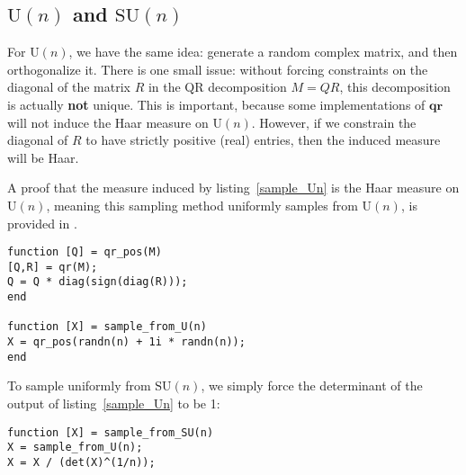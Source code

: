 \documentclass[letterpaper,11pt]{article}
\newcommand{\MG}[2]{\text{#1}(#2)}
\newcommand{\Un}{\MG{U}{n}}
\newcommand{\SUn}{\MG{SU}{n}}
\newcommand{\qr}{\mathbf{qr}}
\begin{document}
\subsection{$\Un$ and $\SUn$}

For $\Un$, we have the same idea: generate a random complex matrix, and then
  orthogonalize it.
There is one small issue: without forcing constraints on the diagonal of the
  matrix $R$ in the QR decomposition $M=QR$, this decomposition is actually
  {\bf not} unique.
This is important, because some implementations of $\qr$ will not induce
  the Haar measure on $\Un$.
However, if we constrain the diagonal of $R$ to have strictly positive (real)
  entries, then the induced measure will be Haar.

A proof that the measure induced by listing~\ref{sample_Un} is the Haar
  measure on $\Un$, meaning this sampling method uniformly samples from $\Un$,
  is provided in \cite{Mezzadri2007}.

\begin{lstlisting}[label=sample_Un,caption=Sampling from $\Un$]
function [Q] = qr_pos(M)
[Q,R] = qr(M);
Q = Q * diag(sign(diag(R)));
end

function [X] = sample_from_U(n)
X = qr_pos(randn(n) + 1i * randn(n));
end
\end{lstlisting}

To sample uniformly from $\SUn$, we simply force the determinant of the
  output of listing~\ref{sample_Un} to be 1:

\begin{lstlisting}[label=sample_SUn,caption=Sampling from $\SUn$]
function [X] = sample_from_SU(n)
X = sample_from_U(n);
X = X / (det(X)^(1/n));
\end{lstlisting}

\thispagestyle{empty}


\end{document}
